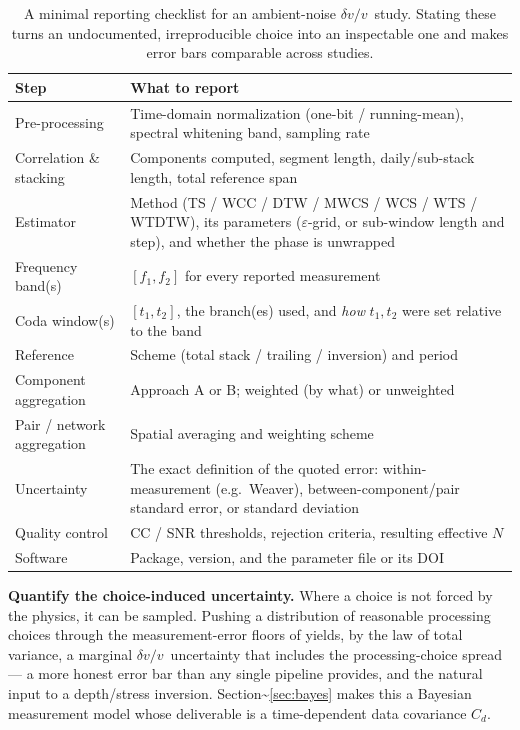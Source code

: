 \documentclass[
  referee]{gji}
\providecommand{\dvv}{\ensuremath{\delta v/v}}
\begin{document}
\begin{table}
\footnotesize
\caption{A minimal reporting checklist for an ambient-noise \dvv\ study. Stating
these turns an undocumented, irreproducible choice into an inspectable one and
makes error bars comparable across studies.}
\label{tab:checklist}
\begin{tabularx}{\textwidth}{@{}>{\raggedright\arraybackslash}p{3.4cm} L@{}}
\toprule
\textbf{Step} & \textbf{What to report} \\
\midrule
Pre-processing & Time-domain normalization (one-bit / running-mean), spectral
whitening band, sampling rate \\ \hline
Correlation \& stacking & Components computed, segment length, daily/sub-stack
length, total reference span \\ \hline
Estimator & Method (TS / WCC / DTW / MWCS / WCS / WTS / WTDTW), its parameters
($\varepsilon$-grid, or sub-window length and step), and whether the phase is
unwrapped \\ \hline
Frequency band(s) & $[f_1,f_2]$ for every reported measurement \\ \hline
Coda window(s) & $[t_1,t_2]$, the branch(es) used, and \emph{how} $t_1,t_2$ were
set relative to the band \\ \hline
Reference & Scheme (total stack / trailing / inversion) and period \\ \hline
Component aggregation & Approach A or B; weighted (by what) or unweighted \\ \hline
Pair / network aggregation & Spatial averaging and weighting scheme \\ \hline
Uncertainty & The exact definition of the quoted error: within-measurement
(e.g.\ Weaver), between-component/pair standard error, or standard deviation \\ \hline
Quality control & CC / SNR thresholds, rejection criteria, resulting effective
$N$ \\ \hline
Software & Package, version, and the parameter file or its DOI \\
\bottomrule
\end{tabularx}
\end{table}

\textbf{Quantify the choice-induced uncertainty.} Where a choice is not
forced by the physics, it can be sampled. Pushing a distribution of
reasonable processing choices through the measurement-error floors of
\citeauthor{Clarke2011}
\citetext{\citeyear{Clarke2011}; \citealp{Weaver2011}} yields, by the
law of total variance, a marginal \dvv~uncertainty that includes the
processing-choice spread --- a more honest error bar than any single
pipeline provides, and the natural input to a depth/stress inversion.
Section\textasciitilde{}\ref{sec:bayes} makes this a Bayesian
measurement model whose deliverable is a time-dependent data covariance
\(C_d\).
\end{document}
